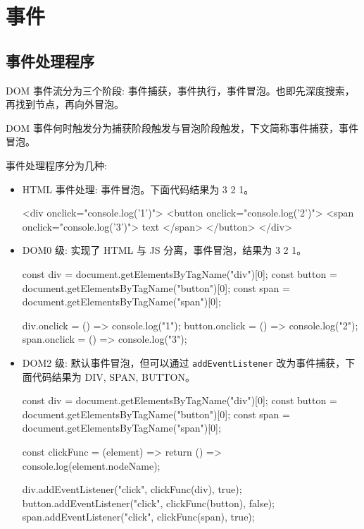 \section{事件}

\subsection{事件处理程序}

DOM 事件流分为三个阶段: 事件捕获，事件执行，事件冒泡。也即先深度搜索，再找到节点，再向外冒泡。

DOM 事件何时触发分为捕获阶段触发与冒泡阶段触发，下文简称事件捕获，事件冒泡。

事件处理程序分为几种:
\begin{itemize}
  \item HTML 事件处理: 事件冒泡。下面代码结果为 3 2 1。
\begin{HTML}
<div onclick="console.log('1')">
  <button onclick="console.log('2')">
    <span onclick="console.log('3')">
      text
    </span>
  </button>
</div>
\end{HTML}
  \item DOM0 级: 实现了 HTML 与 JS 分离，事件冒泡，结果为 3 2 1。
\begin{HTML}
const div = document.getElementsByTagName("div")[0];
const button = document.getElementsByTagName("button")[0];
const span = document.getElementsByTagName("span")[0];

div.onclick = () => console.log("1");
button.onclick = () => console.log("2");
span.onclick = () => console.log("3");
\end{HTML}
  \item DOM2 级: 默认事件冒泡，但可以通过 \texttt{addEventListener} 改为事件捕获，下面代码结果为 DIV, SPAN, BUTTON。
  
\begin{JavaScript}
const div = document.getElementsByTagName("div")[0];
const button = document.getElementsByTagName("button")[0];
const span = document.getElementsByTagName("span")[0];

const clickFunc = (element) => {
  return () => {
    console.log(element.nodeName);
  }
}

div.addEventListener("click", clickFunc(div), true);
button.addEventListener("click", clickFunc(button), false);
span.addEventListener("click", clickFunc(span), true);
\end{JavaScript}

\end{itemize}